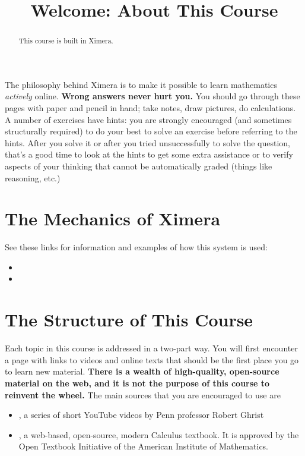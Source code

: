 \documentclass{ximera}
\title{Welcome: About This Course}
\begin{document}
\begin{abstract}
  This course is built in Ximera.
\end{abstract}\maketitle

The philosophy behind Ximera is to make it possible to learn mathematics \textit{actively} online. \textbf{Wrong answers never hurt you.} You should go through these pages with paper and pencil in hand; take notes, draw pictures, do calculations. A number of exercises have hints: you are strongly encouraged (and sometimes structurally required) to do your best to solve an exercise before referring to the hints. After you solve it or after you tried unsuccessfully to solve the question, that's a good time to look at the hints to get some extra assistance or to verify aspects of your thinking that cannot be automatically graded (things like reasoning, etc.)

\section*{The Mechanics of Ximera}

See these links for information and examples of how this system is used:
 \begin{itemize}
 \item {}
 \item {}
 \end{itemize}
  
  
 \section*{The Structure of This Course}
 
 Each topic in this course is addressed in a two-part way. You will first encounter a page with links to videos and online texts that should be the first place you go to learn new material. \textbf{There is a wealth of high-quality, open-source material on the web, and it is not the purpose of this course to reinvent the wheel.} The main sources that you are encouraged to use are
 
 \begin{itemize}
 \item {}, a series of short YouTube videos by Penn professor Robert Ghrist
 \item {}, a web-based, open-source, modern Calculus textbook. It is approved by the Open Textbook Initiative of the American Institute of Mathematics.
 \end{itemize}
 
\end{document}

